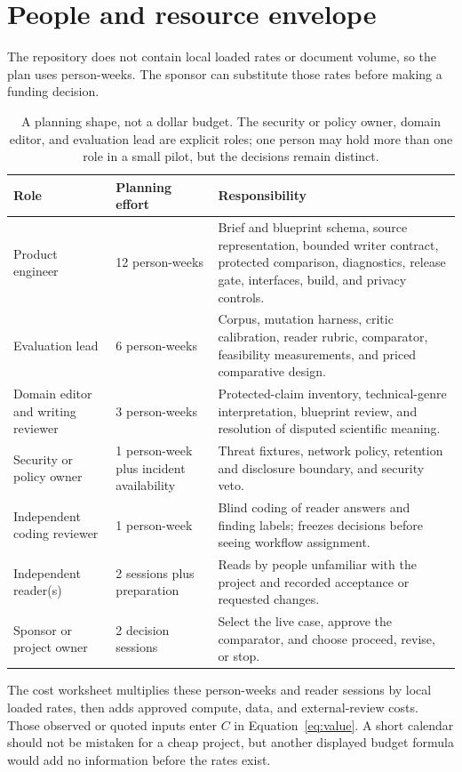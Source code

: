 \section{People and resource envelope}

The repository does not contain local loaded rates or document volume, so the
plan uses person-weeks. The sponsor can substitute those rates before making a
funding decision.

\begin{table}[H]
\centering
\small
\begin{tabularx}{\textwidth}{@{}p{}p{}L@{}}
\toprule
Role & Planning effort & Responsibility \\
\midrule
Product engineer & 12 person-weeks & Brief and blueprint schema, source
representation, bounded writer contract, protected comparison, diagnostics,
release gate, interfaces, build, and privacy controls. \\
Evaluation lead & 6 person-weeks & Corpus, mutation harness, critic calibration,
reader rubric, comparator, feasibility measurements, and priced comparative
design. \\
Domain editor and writing reviewer & 3 person-weeks & Protected-claim inventory,
technical-genre interpretation, blueprint review, and resolution of disputed
scientific meaning. \\
Security or policy owner & 1 person-week plus incident availability & Threat
fixtures, network policy, retention and disclosure boundary, and security veto.
\\
Independent coding reviewer & 1 person-week & Blind coding of reader answers
and finding labels; freezes decisions before seeing workflow assignment. \\
Independent reader(s) & 2 sessions plus preparation & Reads by people unfamiliar with the project and
recorded acceptance or requested changes. \\
Sponsor or project owner & 2 decision sessions & Select the live case, approve
the comparator, and choose proceed, revise, or stop. \\
\bottomrule
\end{tabularx}
\caption{A planning shape, not a dollar budget. The security or policy owner,
domain editor, and evaluation lead are explicit roles; one person may hold more
than one role in a small pilot, but the decisions remain distinct.}
\label{tab:resource-envelope}
\end{table}

The cost worksheet multiplies these person-weeks and reader sessions by local
loaded rates, then adds approved compute, data, and external-review costs. Those
observed or quoted inputs enter $C$ in Equation~\eqref{eq:value}. A short
calendar should not be mistaken for a cheap project, but another displayed
budget formula would add no information before the rates exist.

